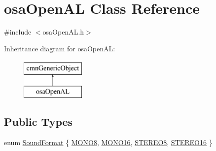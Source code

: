 \hypertarget{classosa_open_a_l}{\section{osa\-Open\-A\-L Class Reference}
\label{classosa_open_a_l}
}


{\ttfamily \#include $<$osa\-Open\-A\-L.\-h$>$}

Inheritance diagram for osa\-Open\-A\-L\-:\begin{figure}[H]
\begin{center}
\leavevmode
\includegraphics[height=2.000000cm]{d9/df2/classosa_open_a_l}
\end{center}
\end{figure}
\subsection*{Public Types}
\begin{DoxyCompactItemize}
\item 
enum \hyperlink{classosa_open_a_l_a81e53573c5d1e8cdcba2cc00784228f2}{Sound\-Format} \{ \hyperlink{classosa_open_a_l_a81e53573c5d1e8cdcba2cc00784228f2ab1e23fa51394321d18b4d36466a74af3}{M\-O\-N\-O8}, 
\hyperlink{classosa_open_a_l_a81e53573c5d1e8cdcba2cc00784228f2ac4ac9b5df84b02ac608e9bceef1e63c7}{M\-O\-N\-O16}, 
\hyperlink{classosa_open_a_l_a81e53573c5d1e8cdcba2cc00784228f2a7f430aef18c2591cd1e88c2d997b9e63}{S\-T\-E\-R\-E\-O8}, 
\hyperlink{classosa_open_a_l_a81e53573c5d1e8cdcba2cc00784228f2a5df4300053eb0ae431ce08e932032ffa}{S\-T\-E\-R\-E\-O16}
 \}
\end{DoxyCompactItemize}
